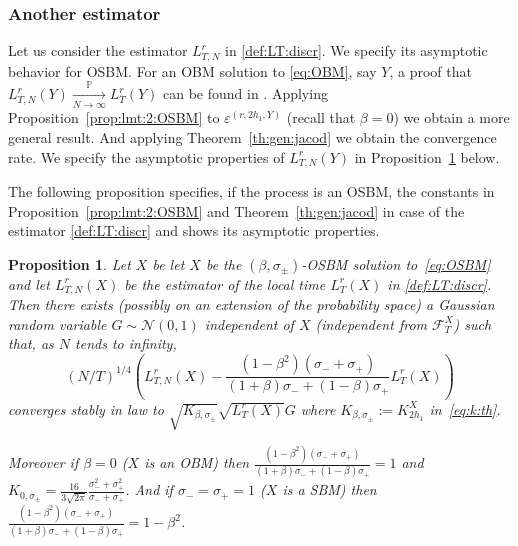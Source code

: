 \documentclass[12pt]{article}
\numberwithin{equation}{section}
\newtheorem{proposition}{Proposition}
\theoremstyle{definition}
\theoremstyle{remark}
\newcommand{\convp}[1][]{\xrightarrow[#1]{\PP}}
\newcommand{\convucp}[1][]{\xrightarrow[#1]{\mathrm{u.c.p.}}}
\newcommand{\PP}{\mathbb{P}}
\begin{document}
\subsubsection{Another estimator}

Let us consider the estimator $L^r_{T,N}$ in \eqref{def:LT:discr}. %
We specify its asymptotic behavior for OSBM.
%
For an OBM solution to \eqref{eq:OBM}, say $Y$, a proof that 
$L^r_{T,N}(Y)  \convp[N\to\infty] L_T^r(Y)$ 
can be found in \cite[Lemma~1]{lp2}.
Applying Proposition~\ref{prop:lmt:2:OSBM} to $\varepsilon^{(r, 2 h_1,Y)}$  (recall that $\beta=0$) we obtain a more general result. 
And applying Theorem~\ref{th:gen:jacod} %
we obtain the convergence rate.
We specify the asymptotic properties of $L^r_{T,N}(Y)$ in Proposition~\ref{prop:localtime:conv:OSBM} below.


The following proposition specifies, if the process is an OSBM, the constants in Proposition~\ref{prop:lmt:2:OSBM} and Theorem~\ref{th:gen:jacod} in case of the estimator \eqref{def:LT:discr} and shows its asymptotic properties.


\begin{proposition} \label{prop:localtime:conv:OSBM} 
Let $X$ be let $X$ be the $(\beta,\sigma_\pm)$-OSBM solution to~\eqref{eq:OSBM} and let ${L}^r_{T,N}(X)$ be the 
estimator of the local time $L^r_T(X)$ in \eqref{def:LT:discr}.
Then there exists (possibly on an extension of the probability space) a Gaussian random variable $G\sim \mathcal N(0,1)$ independent of $X$ (independent from $\mathcal{F}_T^X$) such that, as $N$ tends to infinity,
\begin{equation}
 	 (N/T)^{1/4} \left( L^r_{T,N}(X) -  \frac{(1-\beta^2) (\sigma_-+\sigma_+)}{(1+\beta)\sigma_- + (1-\beta )\sigma_+} L^r_T(X)\right)
\end{equation}
converges stably in law to $\sqrt {K_{\beta, \sigma_\pm}} \sqrt{L^r_T(X)} G$ where $K_{\beta, \sigma_\pm}:=K^X_{2 h_1}$ in~\eqref{eq:k:th}.

Moreover if $\beta=0$ ($X$ is an OBM) then $\frac{(1-\beta^2) (\sigma_-+\sigma_+)}{(1+\beta)\sigma_- + (1-\beta )\sigma_+}=1$ and
$K_{0,\sigma_\pm}= \frac{16}{3 \sqrt{2 \pi}} 
	 \frac{\sigma_-^2 +\sigma_+^2}{\sigma_-+\sigma_+}$.
And if $\sigma_-=\sigma_+ =1$ ($X$ is a SBM) then $\frac{(1-\beta^2) (\sigma_-+\sigma_+)}{(1+\beta)\sigma_- + (1-\beta )\sigma_+}=1-\beta^2$.
\end{proposition}
\end{document}
